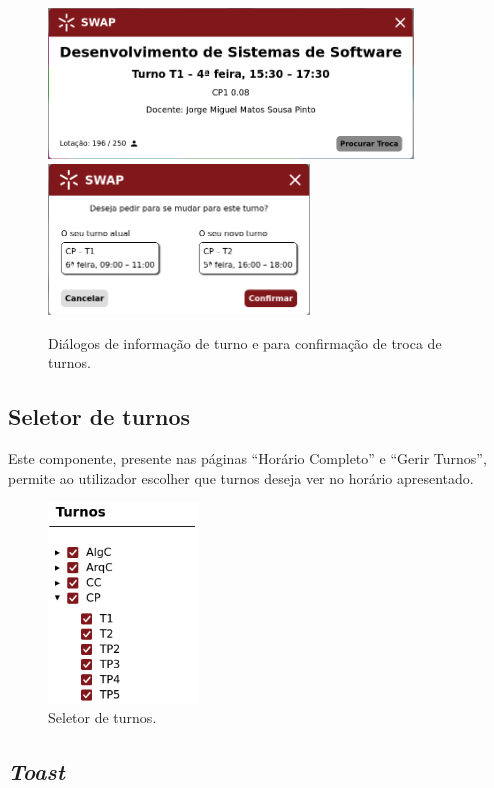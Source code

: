\documentclass[12pt, a4paper]{article}
\begin{document}
\begin{figure}[H]
    \centering
    \includegraphics[height=4cm]{res/components/popup-1.png}
    \includegraphics[height=4cm]{res/components/popup-2.png}
    \caption{Diálogos de informação de turno e para confirmação de troca de turnos.}
    \label{popup}
\end{figure}

\subsection{Seletor de turnos}

Este componente, presente nas páginas ``Horário Completo'' e ``Gerir Turnos'', permite ao utilizador
escolher que turnos deseja ver no horário apresentado.

\begin{figure}[H]
    \centering
    \includegraphics[width=4cm]{res/components/shift-selector.png}
    \caption{Seletor de turnos.}
    \label{shift-selector}
\end{figure}

\subsection{\emph{Toast}}
\end{document}
